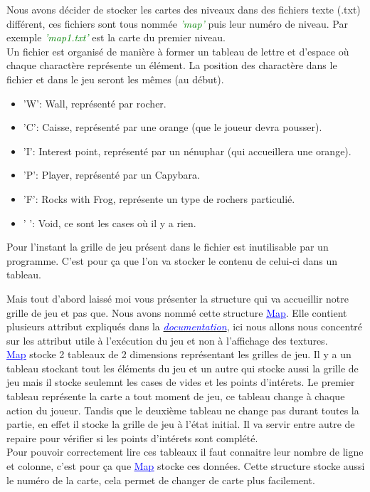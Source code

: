 \documentclass[french, 12pt]{article}
\begin{document}
        Nous avons décider de stocker les cartes des niveaux dans des fichiers texte (.txt) différent, ces fichiers sont tous nommée \textcolor{green}{\textit{'map'}} puis leur numéro de niveau. Par exemple \textcolor{green}{\textit{'map1.txt'}} est la carte du premier niveau. \\
        Un fichier est organisé de manière à former un tableau de lettre et d'espace où chaque charactère représente un élément. La position des charactère dans le fichier et dans le jeu seront les mêmes (au début).
        \begin{itemize}
            \item 'W': Wall, représenté par rocher.
            \item 'C': Caisse, représenté par une orange (que le joueur devra pousser).
            \item 'I': Interest point, représenté par un nénuphar (qui accueillera une orange).
            \item 'P': Player, représenté par un Capybara.
            \item 'F': Rocks with Frog, représente un type de rochers particulié.
            \item ' ': Void, ce sont les cases où il y a rien.\\
        \end{itemize}

        Pour l'instant la grille de jeu présent dans le fichier est inutilisable par un programme. C'est pour ça que l'on va stocker le contenu de celui-ci dans un tableau.

        Mais tout d'abord laissé moi vous présenter la structure qui va accueillir notre grille de jeu et pas que. Nous avons nommé cette structure \href{../doc/html/struct_map.html}{\textcolor{blue}{\underline{Map}}}. Elle contient plusieurs attribut expliqués dans la \href{../doc/html/struct_map.html}{\textcolor{blue}{\textit{documentation}}}, ici nous allons nous concentré sur les attribut utile à l'exécution du jeu et non à l'affichage des textures. \\

        \href{../doc/html/struct_map.html}{\textcolor{blue}{\underline{Map}}} stocke 2 tableaux de 2 dimensions représentant les grilles de jeu. Il y a un tableau stockant tout les éléments du jeu et un autre qui stocke aussi la grille de jeu mais il stocke seulemnt les cases de vides et les points d'intérets. Le premier tableau représente la carte a tout moment de jeu, ce tableau change à chaque action du joueur. Tandis que le deuxième tableau ne change pas durant toutes la partie, en effet il stocke la grille de jeu à l'état initial. Il va servir entre autre de repaire pour vérifier si les points d'intérets sont complété.\\
        Pour pouvoir correctement lire ces tableaux il faut connaitre leur nombre de ligne et colonne, c'est pour ça que \href{../doc/html/struct_map.html}{\textcolor{blue}{\underline{Map}}} stocke ces données. Cette structure stocke aussi le numéro de la carte, cela permet de changer de carte plus facilement.
\end{document}
